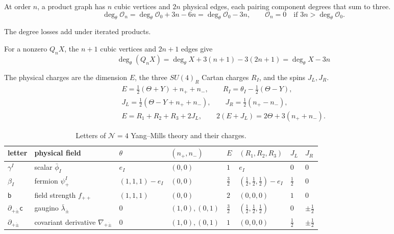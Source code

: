\documentclass[11pt]{article}
\numberwithin{equation}{section}
\numberwithin{figure}{section}
\numberwithin{table}{section}
\begin{document}
At order $n$, a product graph has $n$ cubic vertices and $2n$ physical edges, each pairing component degrees that sum to three.
\begin{equation}\label{eq-2-63}
\deg_\theta\mathcal O_n=\deg_\theta\mathcal O_0+{3n}-{6n}=\deg_\theta\mathcal O_0-3n,\qquad\mathcal O_n=0\quad\text{if }3n>\deg_\theta\mathcal O_0.
\end{equation}

The degree losses add under iterated products.

For a nonzero $Q_nX$, the $n+1$ cubic vertices and $2n+1$ edges give
\begin{equation}\label{eq-graviton-differential-degree}
\deg_\theta(Q_nX)
=\deg_\theta X+3(n+1)-3(2n+1)=\deg_\theta X-3n
\end{equation}

The physical charges are the dimension $E$, the three $SU(4)_R$ Cartan charges $R_I$, and the spins $J_L,J_R$.
\begin{equation}\label{eq-E-charges}
\begin{gathered}E=\tfrac12(\Theta+Y)+n_++n_-,\qquad R_I=\theta_I-\tfrac12(\Theta-Y),\\ J_L=\tfrac12(\Theta-Y+n_++n_-),\qquad J_R=\tfrac12(n_+-n_-),\\ E=R_1+R_2+R_3+2J_L,\qquad 2(E+J_L)=2\Theta+3(n_++n_-).\end{gathered}
\end{equation}

{\small\renewcommand{\arraystretch}{1.25}\setlength{\tabcolsep}{4pt}
\begin{xltabular}{\linewidth}{@{}l>{\raggedright\arraybackslash}Xllllll@{}}
\caption{Letters of $\mathcal N=4$ Yang--Mills theory and their charges.}\label{appE2-0020}\\
\toprule
letter & physical field & $\theta$ & $(n_+,n_-)$ & $E$ & $(R_1,R_2,R_3)$ & $J_L$ & $J_R$\\
\midrule\endhead
$\gamma^I$ & scalar $\bar\phi_I$ & $e_I$ & $(0,0)$ & $1$ & $e_I$ & $0$ & $0$\\
$\beta_I$ & fermion $\psi^I_+$ & $(1,1,1)-e_I$ & $(0,0)$ & $\tfrac32$ & $(\tfrac12,\tfrac12,\tfrac12)-e_I$ & $\tfrac12$ & $0$\\
$\mathsf b$ & field strength $f_{++}$ & $(1,1,1)$ & $(0,0)$ & $2$ & $(0,0,0)$ & $1$ & $0$\\
$\partial_{+\dot\pm}\mathsf c$ & gaugino $\bar\lambda_{\dot\pm}$ & $0$ & $(1,0),(0,1)$ & $\tfrac32$ & $(\tfrac12,\tfrac12,\tfrac12)$ & $0$ & $\pm\tfrac12$\\
$\partial_{+\dot\pm}$ & covariant derivative $\nabla_{+\dot\pm}$ & $0$ & $(1,0),(0,1)$ & $1$ & $(0,0,0)$ & $\tfrac12$ & $\pm\tfrac12$\\
\bottomrule
\end{xltabular}}
\end{document}
